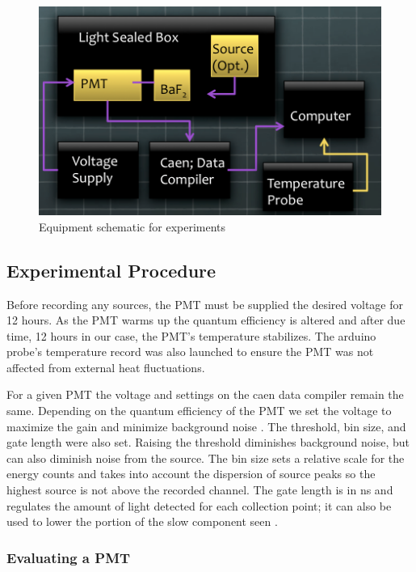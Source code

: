 \documentclass[aip, jmp, amssymb, amsmath, reprint, floatfix]{revtex4-1}
\begin{document}
\begin{figure}
  \centering
    \includegraphics[width=.8\columnwidth]{schem.png}
  \caption{Equipment schematic for experiments}
  \label{fig:schem}
\end{figure} 


\subsection{\label{sec:level2}Experimental Procedure}

Before recording any sources, the PMT must be supplied the desired voltage for 12 hours. As the PMT warms up the quantum efficiency is altered and after due time, 12 hours in our case, the PMT's temperature stabilizes. The arduino probe's temperature record was also launched to ensure the PMT was not affected from external heat fluctuations. 

For a given PMT the voltage and settings on the caen data compiler remain the same. Depending on the quantum efficiency of the PMT we set the voltage to maximize the gain and minimize background noise \cite{PMT}. The threshold, bin size, and gate length were also set. Raising the threshold diminishes background noise, but can also diminish noise from the source. The bin size sets a relative scale for the energy counts and takes into account the dispersion of source peaks so the highest source is not above the recorded channel. The gate length is in ns and regulates the amount of light detected for each collection point; it can also be used to lower the portion of the slow component seen \cite{caen}. 

\subsubsection{\label{sec:level3}Evaluating a PMT}
\end{document}
